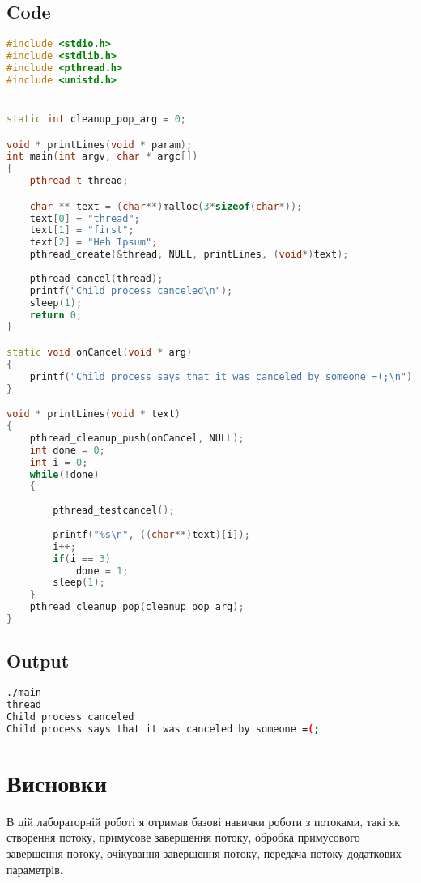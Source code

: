 \documentclass{article}
\begin{document}
\subsection{Code}\vspace{-3mm}
\begin{lstlisting}[language=C++]
#include <stdio.h>
#include <stdlib.h>
#include <pthread.h>
#include <unistd.h>


static int cleanup_pop_arg = 0;

void * printLines(void * param);
int main(int argv, char * argc[])
{
    pthread_t thread;

    char ** text = (char**)malloc(3*sizeof(char*));
    text[0] = "thread"; 
    text[1] = "first"; 
    text[2] = "Heh Ipsum";
    pthread_create(&thread, NULL, printLines, (void*)text);
   
    pthread_cancel(thread);
    printf("Child process canceled\n");
    sleep(1);
    return 0;
}

static void onCancel(void * arg)
{
    printf("Child process says that it was canceled by someone =(;\n");
}

void * printLines(void * text)
{
    pthread_cleanup_push(onCancel, NULL);
    int done = 0;
    int i = 0;
    while(!done)
    {
        
        pthread_testcancel();
        
        printf("%s\n", ((char**)text)[i]);
        i++;
        if(i == 3)
            done = 1;
        sleep(1);
    }
    pthread_cleanup_pop(cleanup_pop_arg);
}

\end{lstlisting}

\subsection{Output}\vspace{-3mm}
\begin{lstlisting}[language=BASH]
./main 
thread
Child process canceled
Child process says that it was canceled by someone =(;
\end{lstlisting}


\section{Висновки}
В цій лабораторній роботі я отримав базові навички роботи з потоками, такі як створення потоку, примусове завершення потоку, обробка примусового завершення потоку, очікування завершення потоку, передача потоку додаткових параметрів.
\end{document}
